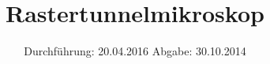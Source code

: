 


\subject{Versuchsprotokoll}
\title{Rastertunnelmikroskop}
\date{
  Durchführung: 20.04.2016
  \hspace{3em}
  Abgabe: 30.10.2014
}




\maketitle
\thispagestyle{empty}






\printbibliography


